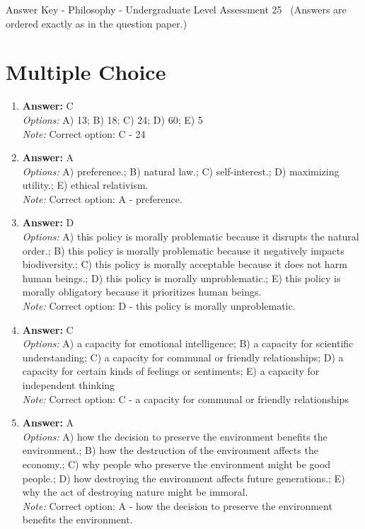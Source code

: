 \documentclass[12pt]{article}
\begin{document}
\begin{center}
Answer Key - Philosophy - Undergraduate Level Assessment 25 \
\small (Answers are ordered exactly as in the question paper.)
\end{center}

\section*{Multiple Choice}
\begin{enumerate}[label=\arabic*.]
\item \textbf{Answer:} C
\\ \textit{Options:} A) 13; B) 18; C) 24; D) 60; E) 5
\\ \textit{Note:} Correct option: C - 24
\item \textbf{Answer:} A
\\ \textit{Options:} A) preference.; B) natural law.; C) self-interest.; D) maximizing utility.; E) ethical relativism.
\\ \textit{Note:} Correct option: A - preference.
\item \textbf{Answer:} D
\\ \textit{Options:} A) this policy is morally problematic because it disrupts the natural order.; B) this policy is morally problematic because it negatively impacts biodiversity.; C) this policy is morally acceptable because it does not harm human beings.; D) this policy is morally unproblematic.; E) this policy is morally obligatory because it prioritizes human beings.
\\ \textit{Note:} Correct option: D - this policy is morally unproblematic.
\item \textbf{Answer:} C
\\ \textit{Options:} A) a capacity for emotional intelligence; B) a capacity for scientific understanding; C) a capacity for communal or friendly relationships; D) a capacity for certain kinds of feelings or sentiments; E) a capacity for independent thinking
\\ \textit{Note:} Correct option: C - a capacity for communal or friendly relationships
\item \textbf{Answer:} A
\\ \textit{Options:} A) how the decision to preserve the environment benefits the environment.; B) how the destruction of the environment affects the economy.; C) why people who preserve the environment might be good people.; D) how destroying the environment affects future generations.; E) why the act of destroying nature might be immoral.
\\ \textit{Note:} Correct option: A - how the decision to preserve the environment benefits the environment.
\end{enumerate}
\end{document}
